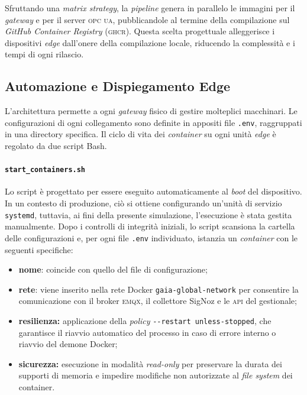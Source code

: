 \documentclass[12pt]{article}
\begin{document}
    Sfruttando una \textit{matrix strategy}, la \textit{pipeline} genera in parallelo le immagini per il \textit{gateway} e per il server \textsc{opc ua}, pubblicandole al termine della compilazione sul \textit{GitHub Container Registry} (\textsc{ghcr}).
    Questa scelta progettuale alleggerisce i dispositivi \textit{edge} dall'onere della compilazione locale, riducendo la complessità e i tempi di ogni rilascio.
    
    \subsection{Automazione e Dispiegamento Edge}
    
    L'architettura permette a ogni \textit{gateway} fisico di gestire molteplici macchinari. Le configurazioni di ogni collegamento sono definite in appositi file \verb|.env|, raggruppati in una directory specifica. Il ciclo di vita dei \textit{container} su ogni unità \textit{edge} è regolato da due script Bash.
    
    \paragraph{\texttt{start\_containers.sh}} 
    Lo script è progettato per essere eseguito automaticamente al \textit{boot} del dispositivo. In un contesto di produzione, ciò si ottiene configurando un'unità di servizio \texttt{systemd}, tuttavia, ai fini della presente simulazione, l'esecuzione è stata gestita manualmente. Dopo i controlli di integrità iniziali, lo script scansiona la cartella delle configurazioni e, per ogni file \verb|.env| individuato, istanzia un \textit{container} con le seguenti specifiche:
    \begin{itemize}
        \item \textbf{nome}: coincide con quello del file di configurazione;
        \item \textbf{rete}: viene inserito nella rete Docker \verb|gaia-global-network| per consentire la comunicazione con il broker \textsc{emqx}, il collettore SigNoz e le \textsc{api} del gestionale;
        \item \textbf{resilienza:} applicazione della \textit{policy} \verb|--restart unless-stopped|, che garantisce il riavvio automatico del processo in caso di errore interno o riavvio del demone Docker;
        \item \textbf{sicurezza:} esecuzione in modalità \textit{read-only} per preservare la durata dei supporti di memoria e impedire modifiche non autorizzate al \textit{file system} dei container.
    \end{itemize}
    
\end{document}

